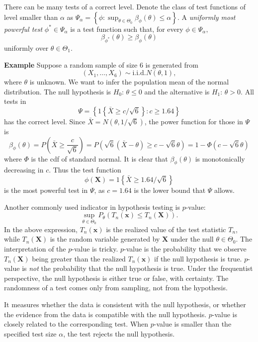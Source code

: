 \documentclass[11pt]{article}
\begin{document}
    There can be many tests of a correct level. Denote the class of test
functions of level smaller than \(\alpha\) as
\(\Psi_{\alpha}=\left\{ \phi:\sup_{\theta\in\Theta_{0}}\beta_{\phi}\left(\theta\right)\leq\alpha\right\}\).
A \emph{uniformly most powerful test} \(\phi^{*}\in\Psi_{\alpha}\) is a
test function such that, for every \(\phi\in\Psi_{\alpha},\)
\[\beta_{\phi^{*}}\left(\theta\right)\geq\beta_{\phi}\left(\theta\right)\]
uniformly over \(\theta\in\Theta_{1}\).

\textbf{Example} Suppose a random sample of size 6 is generated from
\[\left(X_{1},\ldots,X_{6}\right)\sim\text{i.i.d.}N\left(\theta,1\right),\]
where \(\theta\) is unknown. We want to infer the population mean of the
normal distribution. The null hypothesis is \(H_{0}\): \(\theta\leq0\)
and the alternative is \(H_{1}\): \(\theta>0\). All tests in
\[\Psi=\left\{ 1\left\{ \bar{X}\geq c/\sqrt{6}\right\} :c\geq1.64\right\}\]
has the correct level. Since
\(\bar{X}=N\left(\theta,1/\sqrt{6}\right)\), the power function for
those in \(\Psi\) is
\[\beta_{\phi}\left(\theta\right)=P\left(\bar{X}\geq\frac{c}{\sqrt{6}}\right)=P\left(\sqrt{6}\left(\bar{X}-\theta\right)\geq c-\sqrt{6}\theta\right)=1-\Phi\left(c-\sqrt{6}\theta\right)\]
where \(\Phi\) is the cdf of standard normal. It is clear that
\(\beta_{\phi}\left(\theta\right)\) is monotonically decreasing in
\(c\). Thus the test function
\[\phi\left(\mathbf{X}\right)=1\left\{ \bar{X}\geq 1.64/\sqrt{6}\right\}\]
is the most powerful test in \(\Psi\), as \(c=1.64\) is the lower bound
that \(\Psi\) allows.

    Another commonly used indicator in hypothesis testing is \(p\)-value:
\[\sup_{\theta\in\Theta_{0}}P_{\theta}\left(T_{n}\left(\mathbf{x}\right)\leq T_{n}\left(\mathbf{X}\right)\right).\]
In the above expression, \(T_{n}\left(\mathbf{x}\right)\) is the
realized value of the test statistic \(T_{n}\), while
\(T_{n}\left(\mathbf{X}\right)\) is the random variable generated by
\(\mathbf{X}\) under the null \(\theta\in\Theta_{0}\). The
interpretation of the \(p\)-value is tricky. \(p\)-value is the
probability that we observe \(T_n (\mathbf{X})\) being greater than the
realized \(T_n (\mathbf{x} )\) if the null hypothesis is true.
\(p\)-value is \emph{not} the probability that the null hypothesis is
true. Under the frequentist perspective, the null hypothesis is either
true or false, with certainty. The randomness of a test comes only from
sampling, not from the hypothesis.

It measures whether the data is consistent with the null hypothesis, or
whether the evidence from the data is compatible with the null
hypothesis. \(p\)-value is closely related to the corresponding test.
When \(p\)-value is smaller than the specified test size \(\alpha\), the
test rejects the null hypothesis.
\end{document}

